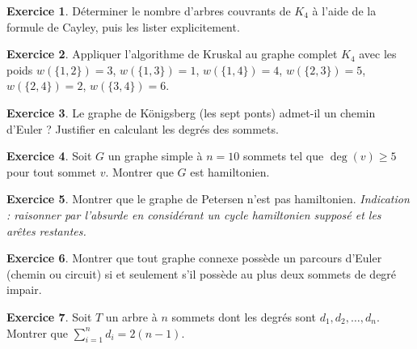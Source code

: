 \documentclass[12pt,a4paper,openany]{book}
\theoremstyle{definition}
\newtheorem{exercice}{Exercice}[chapter]
\theoremstyle{plain}
\theoremstyle{remark}
\begin{document}
\begin{exercice}
Déterminer le nombre d'arbres couvrants de $K_4$ à l'aide de la formule de
Cayley, puis les lister explicitement.
\end{exercice}

\begin{exercice}
Appliquer l'algorithme de Kruskal au graphe complet $K_4$ avec les poids
$w(\{1,2\})=3$, $w(\{1,3\})=1$, $w(\{1,4\})=4$, $w(\{2,3\})=5$,
$w(\{2,4\})=2$, $w(\{3,4\})=6$.
\end{exercice}

\begin{exercice}
Le graphe de Königsberg (les sept ponts) admet-il un chemin d'Euler ?
Justifier en calculant les degrés des sommets.
\end{exercice}

\begin{exercice}
Soit $G$ un graphe simple à $n=10$ sommets tel que $\deg(v) \geq 5$ pour
tout sommet $v$. Montrer que $G$ est hamiltonien.
\end{exercice}

\begin{exercice}
Montrer que le graphe de Petersen n'est pas hamiltonien. \textit{Indication :
raisonner par l'absurde en considérant un cycle hamiltonien supposé et les
arêtes restantes.}
\end{exercice}

\begin{exercice}
Montrer que tout graphe connexe possède un parcours d'Euler (chemin ou
circuit) si et seulement s'il possède au plus deux sommets de degré impair.
\end{exercice}

\begin{exercice}
Soit $T$ un arbre à $n$ sommets dont les degrés sont $d_1, d_2, \dots, d_n$.
Montrer que $\sum_{i=1}^n d_i = 2(n-1)$.
\end{exercice}

\bigskip
\begin{center}
\end{center}
\end{document}
